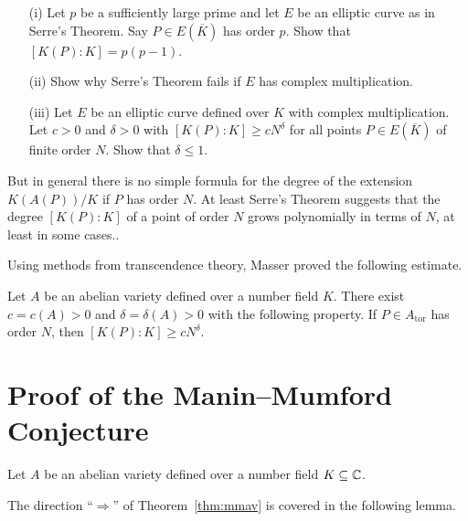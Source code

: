 \begin{exercise}
  \begin{enumerate}
  \item [(i)]  Let $p$ be a sufficiently large prime and let $E$ be
    an elliptic curve as in Serre's Theorem. Say $P\in E(\overline K)$ has
    order $p$. Show that $[K(P):K] = p(p-1)$.
  \item[(ii)] Show why Serre's Theorem fails if $E$ has complex
    multiplication.
  \item[(iii)] Let $E$ be an elliptic curve defined over $K$  with
    complex multiplication. Let $c>0$ and $\delta>0$ with
    $[K(P):K]\ge c N^{\delta}$ for all points $P\in E(\overline K)$ of
    finite order $N$. Show that $\delta \le 1$. 
  \end{enumerate}
\end{exercise}

But in general there is no simple formula for the degree of the
extension $K(A(P))/K$ if $P$ has order $N$. At least Serre's Theorem
suggests that the degree $[K(P):K]$ of a point of order $N$ grows
polynomially in terms of $N$, at least in some cases..

Using methods from transcendence theory, Masser proved the following
estimate.

\begin{theorem}
  \label{thm:masser}
  Let $A$ be an abelian variety defined over a number field $K$. There
  exist $c=c(A)>0$ and $\delta=\delta(A)>0$ with the following
  property. If $P \in A_{\mathrm{tor}}$ has order $N$, then
  $[K(P):K]\ge c N^{\delta}$. 
\end{theorem}





\section{Proof of the Manin--Mumford Conjecture}

Let $A$ be an abelian variety defined over a number field
$K\subseteq{\mathbb{C}}$.

The direction ``$\Longrightarrow$'' of Theorem~\ref{thm:mmav} is covered in
the following lemma.

